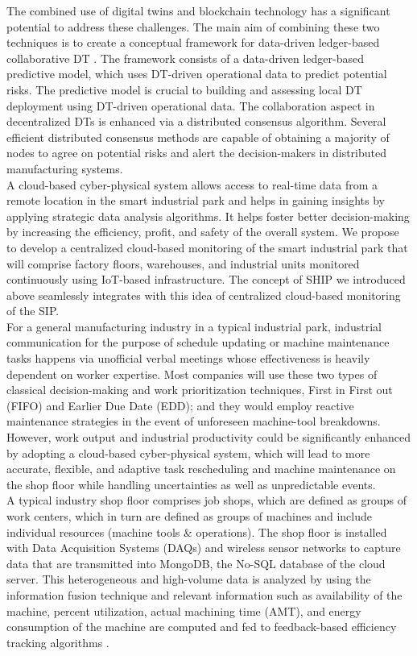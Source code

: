 \documentclass[paper=a4wide, fontsize=12pt]{scrartcl}	 %
\begin{document}
The combined use of digital twins and blockchain technology has a significant potential to address these challenges. The main aim of combining these two techniques is to create a conceptual framework for data-driven ledger-based collaborative DT \cite{machines9090193}. The framework consists of a data-driven ledger-based predictive model, which uses DT-driven operational data to predict potential risks. The predictive model is crucial to building and assessing local DT deployment using DT-driven operational data. The collaboration aspect in decentralized DTs is enhanced via a distributed consensus algorithm. Several efficient distributed consensus methods are capable of obtaining a majority of nodes to agree on potential risks and alert the decision-makers in distributed manufacturing systems. \\

A cloud-based cyber-physical system allows access to real-time data from a remote location in the smart industrial park and helps in gaining insights by applying strategic data analysis algorithms. It helps foster better decision-making by increasing the efficiency, profit, and safety of the overall system. We propose to develop a centralized cloud-based monitoring of the smart industrial park that will comprise factory floors, warehouses, and industrial units monitored continuously using IoT-based infrastructure. The concept of SHIP we introduced above seamlessly integrates with this idea of centralized cloud-based monitoring of the SIP. \\

For a general manufacturing industry in a typical industrial park, industrial communication for the purpose of schedule updating or machine maintenance tasks happens via unofficial verbal meetings whose effectiveness is heavily dependent on worker expertise. Most companies will use these two types of classical decision-making and work prioritization techniques, First in First out (FIFO) and Earlier Due Date (EDD); and they would employ reactive maintenance strategies in the event of unforeseen machine-tool breakdowns. However, work output and industrial productivity could be significantly enhanced by adopting a cloud-based cyber-physical system, which will lead to more accurate, flexible, and adaptive task rescheduling and machine maintenance on the shop floor while handling uncertainties as well as unpredictable events. \\

A typical industry shop floor comprises job shops, which are defined as groups of work centers, which in turn are defined as groups of machines and include individual resources (machine tools \& operations). The shop floor is installed with Data Acquisition Systems (DAQs) and wireless sensor networks to capture data that are transmitted into MongoDB, the No-SQL database of the cloud server. This heterogeneous and high-volume data is analyzed by using the information fusion technique and relevant information such as availability of the machine, percent utilization, actual machining time (AMT), and energy consumption of the machine are computed and fed to feedback-based efficiency tracking algorithms \cite{QIU201316}.
\end{document}
